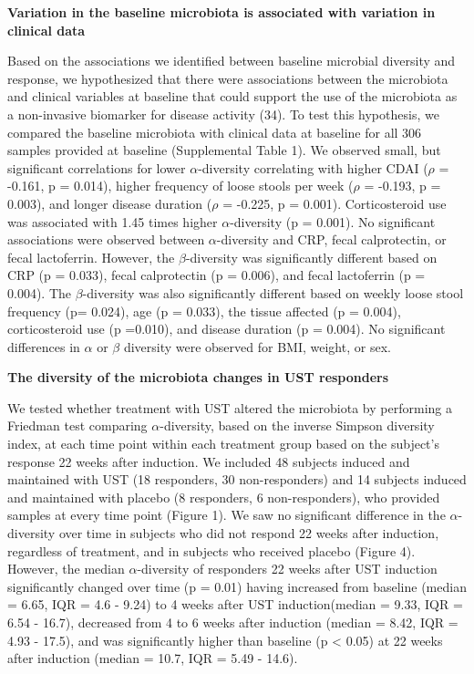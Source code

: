 \documentclass[12pt,]{article}
\begin{document}
\textbf{Variation in the baseline microbiota is associated with
variation in clinical data}

Based on the associations we identified between baseline microbial
diversity and response, we hypothesized that there were associations
between the microbiota and clinical variables at baseline that could
support the use of the microbiota as a non-invasive biomarker for
disease activity (34). To test this hypothesis, we compared the baseline
microbiota with clinical data at baseline for all 306 samples provided
at baseline (Supplemental Table 1). We observed small, but significant
correlations for lower \({\alpha}\)-diversity correlating with higher
CDAI (\({\rho}\) = -0.161, p = 0.014), higher frequency of loose stools
per week (\({\rho}\) = -0.193, p = 0.003), and longer disease duration
(\({\rho}\) = -0.225, p = 0.001). Corticosteroid use was associated with
1.45 times higher \({\alpha}\)-diversity (p = 0.001). No significant
associations were observed between \({\alpha}\)-diversity and CRP, fecal
calprotectin, or fecal lactoferrin. However, the \({\beta}\)-diversity
was significantly different based on CRP (p = 0.033), fecal calprotectin
(p = 0.006), and fecal lactoferrin (p = 0.004). The
\({\beta}\)-diversity was also significantly different based on weekly
loose stool frequency (p= 0.024), age (p = 0.033), the tissue affected
(p = 0.004), corticosteroid use (p =0.010), and disease duration (p =
0.004). No significant differences in \({\alpha}\) or \({\beta}\)
diversity were observed for BMI, weight, or sex.

\textbf{The diversity of the microbiota changes in UST responders}

We tested whether treatment with UST altered the microbiota by
performing a Friedman test comparing \({\alpha}\)-diversity, based on
the inverse Simpson diversity index, at each time point within each
treatment group based on the subject's response 22 weeks after
induction. We included 48 subjects induced and maintained with UST (18
responders, 30 non-responders) and 14 subjects induced and maintained
with placebo (8 responders, 6 non-responders), who provided samples at
every time point (Figure 1). We saw no significant difference in the
\({\alpha}\)-diversity over time in subjects who did not respond 22
weeks after induction, regardless of treatment, and in subjects who
received placebo (Figure 4). However, the median \({\alpha}\)-diversity
of responders 22 weeks after UST induction significantly changed over
time (p = 0.01) having increased from baseline (median = 6.65, IQR = 4.6
- 9.24) to 4 weeks after UST induction(median = 9.33, IQR = 6.54 -
16.7), decreased from 4 to 6 weeks after induction (median = 8.42, IQR =
4.93 - 17.5), and was significantly higher than baseline (p \textless{}
0.05) at 22 weeks after induction (median = 10.7, IQR = 5.49 - 14.6).
\end{document}
